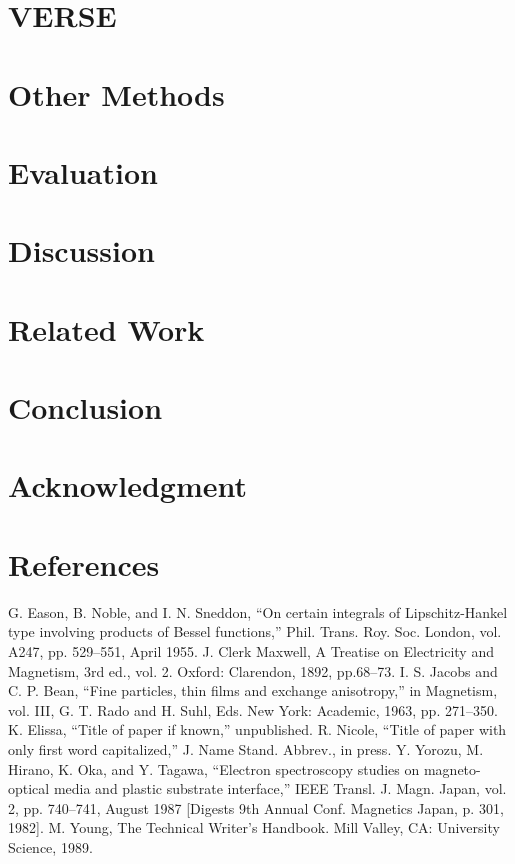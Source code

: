 \documentclass[conference]{IEEEtran}
\begin{document}
\section{VERSE}

\section{Other Methods}

\section{Evaluation}

\section{Discussion}

\section{Related Work}

\section{Conclusion}

\section*{Acknowledgment}

\section*{References}


\begin{thebibliography}{00}
 G. Eason, B. Noble, and I. N. Sneddon, ``On certain integrals of Lipschitz-Hankel type involving products of Bessel functions,'' Phil. Trans. Roy. Soc. London, vol. A247, pp. 529--551, April 1955.
 J. Clerk Maxwell, A Treatise on Electricity and Magnetism, 3rd ed., vol. 2. Oxford: Clarendon, 1892, pp.68--73.
 I. S. Jacobs and C. P. Bean, ``Fine particles, thin films and exchange anisotropy,'' in Magnetism, vol. III, G. T. Rado and H. Suhl, Eds. New York: Academic, 1963, pp. 271--350.
 K. Elissa, ``Title of paper if known,'' unpublished.
 R. Nicole, ``Title of paper with only first word capitalized,'' J. Name Stand. Abbrev., in press.
 Y. Yorozu, M. Hirano, K. Oka, and Y. Tagawa, ``Electron spectroscopy studies on magneto-optical media and plastic substrate interface,'' IEEE Transl. J. Magn. Japan, vol. 2, pp. 740--741, August 1987 [Digests 9th Annual Conf. Magnetics Japan, p. 301, 1982].
 M. Young, The Technical Writer's Handbook. Mill Valley, CA: University Science, 1989.
\end{thebibliography}
\end{document}
